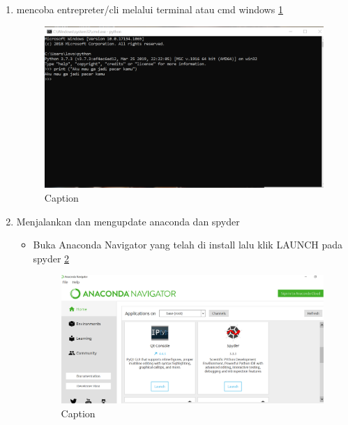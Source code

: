 \begin{enumerate}
    \item mencoba entrepreter/cli melalui terminal atau cmd windows \ref{capture11}
    \begin{figure} [h]
            \centering
            \includegraphics[scale=0.3]{figures/Capture11.PNG}
            \caption{Caption}
            \label{capture11}
        \end{figure}
        \item Menjalankan dan mengupdate anaconda dan spyder 
        \begin{itemize}
            \item Buka Anaconda Navigator yang telah di install lalu klik LAUNCH pada spyder \ref{capture12}
        \begin{figure} [h]
            \centering
            \includegraphics[scale=0.3]{figures/Capture12.PNG}
            \caption{Caption}
            \label{capture12}
        \end{figure}
        \end{itemize}
        

\end{enumerate}
